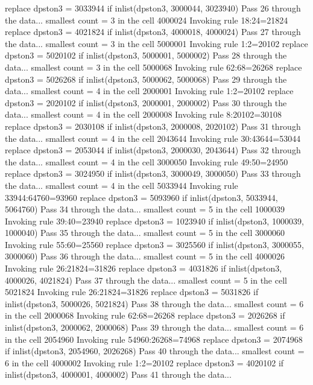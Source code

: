   replace dpston3 = 3033944 if inlist(dpston3, 3000044, 3023940)
Pass 26 through the data...
  smallest count = 3 in the cell      4000024
  Invoking rule 18:24=21824
  replace dpston3 = 4021824 if inlist(dpston3, 4000018, 4000024)
Pass 27 through the data...
  smallest count = 3 in the cell      5000001
  Invoking rule 1:2=20102
  replace dpston3 = 5020102 if inlist(dpston3, 5000001, 5000002)
Pass 28 through the data...
  smallest count = 3 in the cell      5000068
  Invoking rule 62:68=26268
  replace dpston3 = 5026268 if inlist(dpston3, 5000062, 5000068)
Pass 29 through the data...
  smallest count = 4 in the cell      2000001
  Invoking rule 1:2=20102
  replace dpston3 = 2020102 if inlist(dpston3, 2000001, 2000002)
Pass 30 through the data...
  smallest count = 4 in the cell      2000008
  Invoking rule 8:20102=30108
  replace dpston3 = 2030108 if inlist(dpston3, 2000008, 2020102)
Pass 31 through the data...
  smallest count = 4 in the cell      2043644
  Invoking rule 30:43644=53044
  replace dpston3 = 2053044 if inlist(dpston3, 2000030, 2043644)
Pass 32 through the data...
  smallest count = 4 in the cell      3000050
  Invoking rule 49:50=24950
  replace dpston3 = 3024950 if inlist(dpston3, 3000049, 3000050)
Pass 33 through the data...
  smallest count = 4 in the cell      5033944
  Invoking rule 33944:64760=93960
  replace dpston3 = 5093960 if inlist(dpston3, 5033944, 5064760)
Pass 34 through the data...
  smallest count = 5 in the cell      1000039
  Invoking rule 39:40=23940
  replace dpston3 = 1023940 if inlist(dpston3, 1000039, 1000040)
Pass 35 through the data...
  smallest count = 5 in the cell      3000060
  Invoking rule 55:60=25560
  replace dpston3 = 3025560 if inlist(dpston3, 3000055, 3000060)
Pass 36 through the data...
  smallest count = 5 in the cell      4000026
  Invoking rule 26:21824=31826
  replace dpston3 = 4031826 if inlist(dpston3, 4000026, 4021824)
Pass 37 through the data...
  smallest count = 5 in the cell      5021824
  Invoking rule 26:21824=31826
  replace dpston3 = 5031826 if inlist(dpston3, 5000026, 5021824)
Pass 38 through the data...
  smallest count = 6 in the cell      2000068
  Invoking rule 62:68=26268
  replace dpston3 = 2026268 if inlist(dpston3, 2000062, 2000068)
Pass 39 through the data...
  smallest count = 6 in the cell      2054960
  Invoking rule 54960:26268=74968
  replace dpston3 = 2074968 if inlist(dpston3, 2054960, 2026268)
Pass 40 through the data...
  smallest count = 6 in the cell      4000002
  Invoking rule 1:2=20102
  replace dpston3 = 4020102 if inlist(dpston3, 4000001, 4000002)
Pass 41 through the data...
